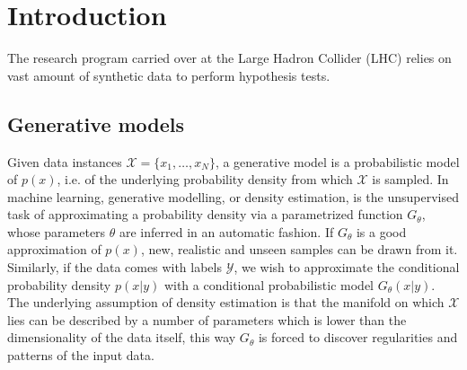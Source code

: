 %
%
%

\chapter{Introduction}\label{chap:introduction}
\enlargethispage{2ex}
\vspace*{-2pt}

The research program carried over at the Large Hadron Collider (LHC) relies on vast amount of synthetic data to perform hypothesis tests.  

\section{Generative models}\label{sec:gmm}
Given data instances $\mathcal{X} = \{ x_1, \ldots , x_N \}$, a generative model is a probabilistic model of $p(x)$, i.e. of the underlying probability density from which $\mathcal{X}$ is sampled. 
In machine learning, generative modelling, or density estimation, is the unsupervised task of approximating a probability density via a parametrized function $G_{\theta}$, whose parameters $\theta$ are inferred in an automatic fashion. If $G_{\theta}$ is a good approximation of $p(x)$, new, realistic and unseen samples can be drawn from it.
Similarly, if the data comes with labels $\mathcal{Y}$, we wish to approximate the conditional probability density $p(x | y)$ with a conditional probabilistic model $G_{\theta}(x | y)$.
The underlying assumption of density estimation is that the manifold on which $\mathcal{X}$ lies can be described by a number of parameters which is lower than the dimensionality of the data itself, this way $G_{\theta}$ 
is forced to discover regularities and patterns of the input data.

